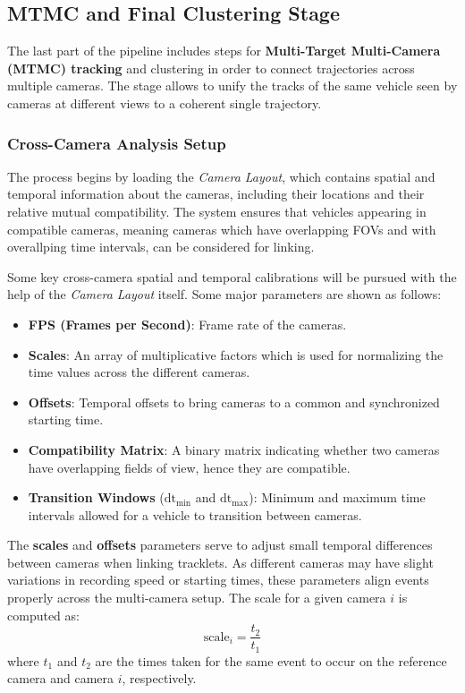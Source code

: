 \subsection{MTMC and Final Clustering Stage}
\label{subsec:MTMC}

The last part of the pipeline includes steps for \textbf{Multi-Target Multi-Camera (MTMC) tracking} and clustering in order to connect trajectories across multiple cameras. The stage allows to unify the tracks of the same vehicle seen by cameras at different views to a coherent single trajectory.

\subsubsection{Cross-Camera Analysis Setup}
The process begins by loading the \textit{Camera Layout}, which contains spatial and temporal information about the cameras, including their locations and their relative mutual compatibility. The system ensures that vehicles appearing in compatible cameras, meaning cameras which have overlapping FOVs and with overallping time intervals, can be considered for linking.

Some key cross-camera spatial and temporal calibrations will be pursued with the help of the \textit{Camera Layout} itself. Some major parameters are shown as follows:
\begin{itemize}
    \item \textbf{FPS (Frames per Second)}: Frame rate of the cameras.
    \item \textbf{Scales}: An array of multiplicative factors which is used for normalizing the time values across the different cameras.
    \item \textbf{Offsets}: Temporal offsets to bring cameras to a common and synchronized starting time.
    \item \textbf{Compatibility Matrix}: A binary matrix indicating whether two cameras have overlapping fields of view, hence they are compatible.
    \item \textbf{Transition Windows} (\(\text{dt}_{\min}\) and \(\text{dt}_{\max}\)): Minimum and maximum time intervals allowed for a vehicle to transition between cameras.
\end{itemize}

The \textbf{scales} and \textbf{offsets} parameters serve to adjust small temporal differences between cameras when linking tracklets. As different cameras may have slight variations in recording speed or starting times, these parameters align events properly across the multi-camera setup.
The scale for a given camera \(i\) is computed as:
\[
    \text{scale}_i = \frac{t_{2}}{t_{1}}
\]
where \(t_{1}\) and \(t_{2}\) are the times taken for the same event to occur on the reference camera and camera \(i\), respectively.

